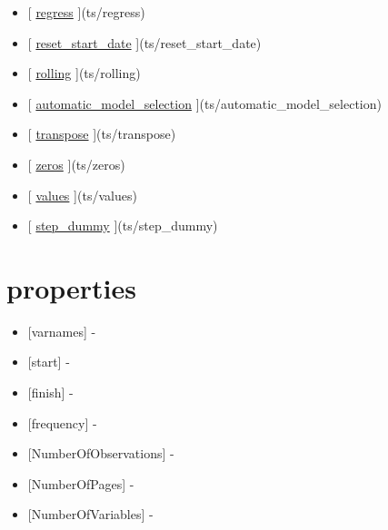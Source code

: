 \documentclass[letterpaper,10pt,english]{sphinxmanual}
\begin{document}
\begin{itemize}
\item {} 
{[} {\hyperref[classes/time_series/@ts/ts:regress]{regress}} {]}(ts/regress)

\item {} 
{[} {\hyperref[classes/time_series/@ts/ts:reset-start-date]{reset\_start\_date}} {]}(ts/reset\_start\_date)

\item {} 
{[} {\hyperref[classes/time_series/@ts/ts:rolling]{rolling}} {]}(ts/rolling)

\item {} 
{[} {\hyperref[classes/time_series/@ts/ts:automatic-model-selection]{automatic\_model\_selection}} {]}(ts/automatic\_model\_selection)

\item {} 
{[} {\hyperref[classes/time_series/@ts/ts:transpose]{transpose}} {]}(ts/transpose)

\item {} 
{[} {\hyperref[classes/time_series/@ts/ts:zeros]{zeros}} {]}(ts/zeros)

\item {} 
{[} {\hyperref[classes/time_series/@ts/ts:values]{values}} {]}(ts/values)

\item {} 
{[} {\hyperref[classes/time_series/@ts/ts:step-dummy]{step\_dummy}} {]}(ts/step\_dummy)

\end{itemize}


\section{properties}
\label{classes/time_series/@ts/ts:properties}\begin{itemize}
\item {} 
{[}varnames{]} -

\item {} 
{[}start{]} -

\item {} 
{[}finish{]} -

\item {} 
{[}frequency{]} -

\item {} 
{[}NumberOfObservations{]} -

\item {} 
{[}NumberOfPages{]} -

\item {} 
{[}NumberOfVariables{]} -

\end{itemize}
\end{document}
